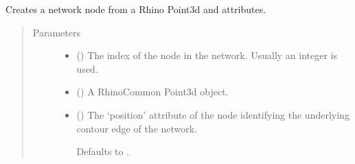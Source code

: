 \documentclass[letterpaper,10pt,english]{sphinxmanual}
\begin{document}
\begin{fulllineitems}
\begin{fulllineitems}
\begin{quote}
\begin{description}
\end{description}\end{quote}

\end{fulllineitems}


\begin{fulllineitems}
\label{\detokenize{cockatoo:cockatoo.KnitNetworkBase.node_from_point3d}}
Creates a network node from a Rhino Point3d and attributes.
\begin{quote}\begin{description}
\item[{Parameters}] \leavevmode\begin{itemize}
\item {} 
 () \textendash{} The index of the node in the network. Usually an integer is used.

\item {} 
 () \textendash{} A RhinoCommon Point3d object.

\item {} 
 (\sphinxstyleliteralemphasis{\sphinxupquote{, }}) \textendash{} 
The ‘position’ attribute of the node identifying the underlying
contour edge of the network.

Defaults to .



\end{itemize}
\end{description}
\end{quote}
\end{fulllineitems}
\end{fulllineitems}
\end{document}
